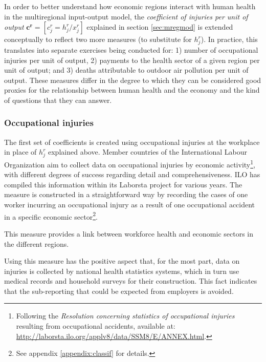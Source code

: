 \documentclass[a4paper,12pt, ]{article}
\begin{document}
In order to better understand how economic regions interact with human health in the multiregional input-output model, the \textit{coefficient of injuries per unit of output} $\mathbf{c^r}=[c^r_{j}=h^r_j/x^r_j]$ explained in section \ref{sec:mregmod} is extended conceptually to reflect two more measures (to substitute for $h^r_j$). In practice, this translates into separate
exercises being conducted for: 1) number of occupational injuries per unit of output, 2) payments to the health sector of a given region per unit of output; and 3) deaths attributable to outdoor air pollution per unit of output. These measures differ in the degree to which they can be considered good proxies for the relationship between human health and the economy and the kind of questions that they can answer. 


\subsubsection{Occupational injuries}
\label{subsec:injuries}

The first set of coefficients is created using occupational injuries at the workplace in place of $h^r_j$ explained above. Member countries of the International Labour Organization aim to collect data on occupational injuries by economic activity\footnote{Following the \textit{Resolution concerning statistics of occupational injuries} resulting from occupational accidents, available at: \newline \url{http://laborsta.ilo.org/applv8/data/SSM8/E/ANNEX.html}.}, with different degrees of success regarding detail and comprehensiveness. ILO has compiled this information within its Laborsta project for various years. The measure is constructed in a straightforward way by recording the cases of one worker incurring an occupational injury as a result of one occupational accident in a specific economic sector\footnote{See appendix \ref{appendix:classif} for details.}.

This measure provides a link between workforce health and economic sectors in the different regions. 

Using this measure has the positive aspect that, for the most part, data on injuries is collected by national health statistics systems, which in turn use medical records and household surveys for their construction. This fact indicates that the sub-reporting that could be expected from employers is avoided. 
\end{document}
